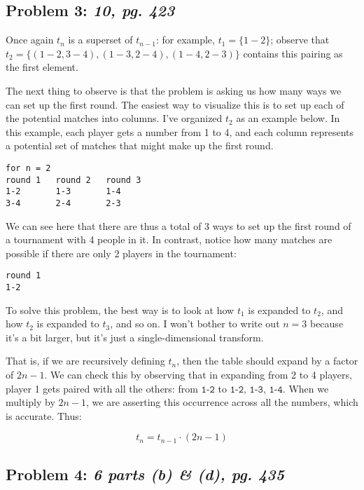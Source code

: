 \documentclass[a4paper]{article}
\begin{document}
\subsection*{Problem 3: \textit{10, pg. 423}}

Once again $t_n$ is a superset of $t_{n-1}$: for example, $t_1 = \{1-2\}$; observe that $t_2 = \{(1-2, 3-4), (1-3, 2-4), (1-4, 2-3)\}$ contains this pairing as the first element.

The next thing to observe is that the problem is asking us how many ways we can set up the first round. The easiest way to visualize this is to set up each of the potential matches into columns. I've organized $t_2$ as an example below. In this example, each player gets a number from 1 to 4, and each column represents a potential set of matches that might make up the first round.

\begin{verbatim}
for n = 2
round 1   round 2   round 3
1-2       1-3       1-4
3-4       2-4       2-3
\end{verbatim}

We can see here that there are thus a total of 3 ways to set up the first round of a tournament with 4 people in it. In contrast, notice how many matches are possible if there are only 2 players in the tournament:

\begin{verbatim}
round 1
1-2
\end{verbatim}

To solve this problem, the best way is to look at how $t_1$ is expanded to $t_2$, and how $t_2$ is expanded to $t_3$, and so on. I won't bother to write out $n=3$ because it's a bit larger, but it's just a single-dimensional transform.

That is, if we are recursively defining $t_n$, then the table should expand by a factor of $2n-1$. We can check this by observing that in expanding from 2 to 4 players, player 1 gets paired with all the others: from $\texttt{1-2}$ to $\texttt{1-2, 1-3, 1-4}$. When we multiply by $2n-1$, we are asserting this occurrence across all the numbers, which is accurate. Thus:

\begin{equation}
t_n = t_{n-1} \cdot (2n-1)
\end{equation}

\subsection*{Problem 4: \textit{6 parts (b) \& (d), pg. 435}} 
\end{document}
